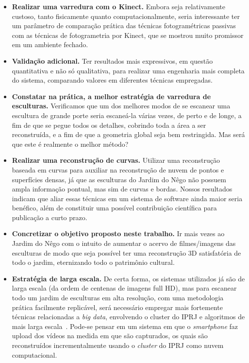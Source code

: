 \begin{itemize}
\item \textbf{Realizar uma varredura com o Kinect.} Embora seja relativamente
  custoso, tanto fisicamente quanto computacionalmente, seria interessante ter
  um parâmetro de comparação prática das técnicas fotogramétricas passivas com
as técnicas de fotogrametria por Kinect, que se mostrou muito promissor em um
ambiente fechado.  
\item \textbf{Validação adicional.} Ter resultados mais
  expressivos, em questão quantitativa e não só qualitativa, para realizar uma
  engenharia mais completa do sistema, comparando valores em diferentes técnicas
  empregadas.
\item \textbf{Constatar na prática, a melhor estratégia de varredura de
  esculturas.}
Verificamos que um dos melhores modos de se escanear uma escultura de grande
porte seria escaneá-la várias vezes, de perto e de longe, a fim de que se pegue todos os detalhes,
cobrindo toda a área a ser reconstruída, e a fim de que a geometria global seja
bem restringida. Mas será que este é realmente o melhor método?  
\item \textbf{Realizar uma reconstrução de curvas.} 
  Utilizar uma reconstrução baseada em curvas para auxiliar na reconstrução de
  nuvem de pontos e superfícies densas, já que as esculturas do Jardim do Nêgo
  não possuem ampla informação pontual, mas sim de curvas e bordas. Nossos
  resultados indicam que aliar essas técnicas em um sistema de software ainda
  maior seria benéfico, além de constituir uma possível contribuição científica
  para publicação a curto prazo.
\item \textbf{Concretizar o objetivo proposto neste trabalho.} Ir mais vezes
  ao Jardim do Nêgo com o intuito de aumentar o acervo de filmes/imagens das
  esculturas de modo que seja possível ter uma reconstrução 3D satisfatória de
  todo o jardim, eternizando todo o patrimônio cultural.  
\item \textbf{Estratégia de larga escala.} De certa forma, os sistemas
  utilizados já são de
  larga escala (da ordem de centenas de imagens full HD), mas para escanear todo um jardim de esculturas em alta
  resolução, com uma metodologia prática facilmente replicável,
  será necessário empregar mais fortemente técnicas relacionadas a \emph{big data}, envolvendo o cluster do IPRJ
  e algoritmos de mais larga escala~\cite{Argarwal:Snavely:etal:ICCV09}. Pode-se pensar em um sistema em que o
  \emph{smartphone} faz upload dos vídeos na medida em que são capturados, os
  quais são reconstruídos incrementalmente usando o \emph{cluster} do IPRJ como nuvem computacional.
\end{itemize}
